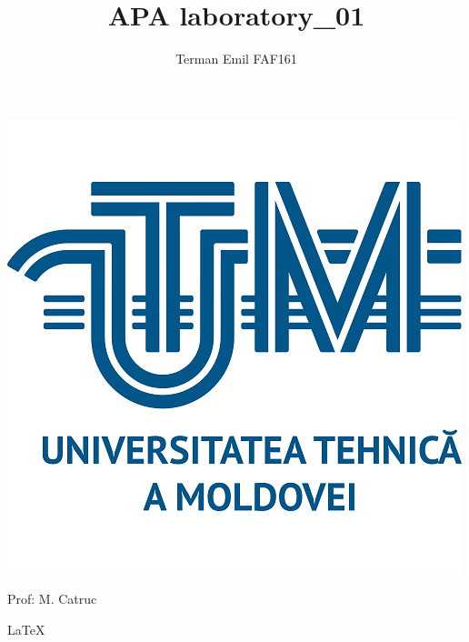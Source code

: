 \documentclass{article}
\begin{document}

	\makeatletter
	\newenvironment{sqcases} {
		\matrix@check\sqcases\env@sqcases
	}{
		\endarray \right.
	}
	\def\env@sqcases {
		\let \@ifnextchar \new@ifnextchar
		\left \lbrack
		\def \arraystretch{1.2}
		\array{@{}l@{\quad}l@{}}
	}
	\makeatother


	\title{APA laboratory\_01}
	\author{Terman Emil FAF161}
	\maketitle

	\vspace*{\fill}
	
	\centering
	\includegraphics{imgs/UTM_logo.png}

	\begin{flushright}
		Prof: M. Catruc
	\end{flushright}

	\LaTeX
	\pagebreak
\end{document}
